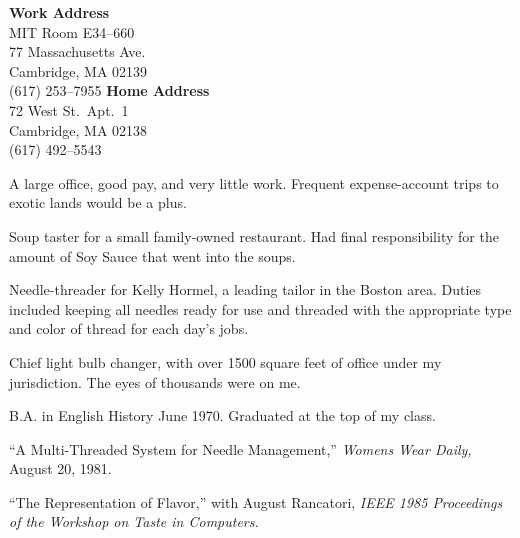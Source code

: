 




\addresses
{{\bf Work Address} \\
MIT Room E34--660 \\
77 Massachusetts Ave. \\
Cambridge, MA 02139 \\
(617) 253--7955}
{{\bf Home Address} \\
72 West St.~Apt.~1 \\
Cambridge, MA 02138 \\
(617) 492--5543}

\begin{llist}
A large office, good pay, and very little work.
Frequent expense-account trips to exotic lands would be a plus.

 
Soup taster for a small family-owned restaurant.  Had final
responsibility for the amount of Soy Sauce that went into the soups.

 
Needle-threader for Kelly Hormel, a leading tailor in the Boston area.
Duties included keeping all needles ready for use and threaded with
the appropriate type and color of thread for each day's jobs.

 
Chief light bulb changer, with over 1500 square feet of office under my
jurisdiction.  The eyes of thousands were on me.

 
B.A. in English History June 1970.  Graduated at the top of my class.

``A Multi-Threaded System for Needle Management,'' {\em Womens Wear Daily,}
August 20, 1981.

``The Representation of Flavor,'' with August Rancatori, {\em IEEE 1985
Proceedings of the Workshop on Taste in Computers.}

\end{llist}

